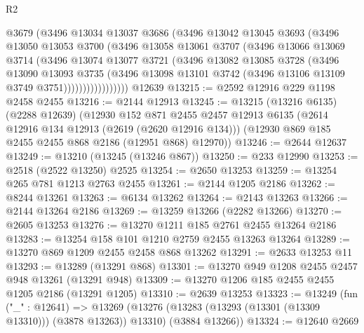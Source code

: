 \begin{lexlean}{R2}
\begin{coremodule}
                  @3679
                  (@3496
                    @13034
                    @13037
                    @3686
                    (@3496
                      @13042
                      @13045
                      @3693
                      (@3496
                        @13050
                        @13053
                        @3700
                        (@3496
                          @13058
                          @13061
                          @3707
                          (@3496
                            @13066
                            @13069
                            @3714
                            (@3496
                              @13074
                              @13077
                              @3721
                              (@3496
                                @13082
                                @13085
                                @3728
                                (@3496
                                  @13090
                                  @13093
                                  @3735
                                  (@3496
                                    @13098
                                    @13101
                                    @3742
                                    (@3496 @13106 @13109 @3749 @3751)))))))))))))))))
    @12639
@13215 := @2592 @12916 @229 @1198 @2458 @2455
@13216 := @2144 @12913
@13245 := @13215
    (@13216 @6135)
    (@2288 @12639)
    (@12930
      @152
      @871
      @2455
      @2457
      @12913
      @6135
      (@2614 @12916 @134 @12913 (@2619 (@2620 @12916 @134)))
      (@12930 @869 @185 @2455 @2455 @868 @2186 (@12951 @868) @12970))
@13246 := @2644 @12637
@13249 := @13210 (@13245 (@13246 @867))
@13250 := @233 @12990
@13253 := @2518 (@2522 @13250) @2525
@13254 := @2650 @13253
@13259 := @13254 @265 @781 @1213 @2763 @2455
@13261 := @2144 @1205 @2186
@13262 := @8244 @13261
@13263 := @6134 @13262
@13264 := @2143 @13263
@13266 := @2144 @13264 @2186
@13269 := @13259 @13266 (@2282 @13266)
@13270 := @2605 @13253
@13276 := @13270 @1211 @185 @2761 @2455 @13264 @2186
@13283 := @13254 @158 @101 @1210 @2759 @2455 @13263 @13264
@13289 := @13270 @869 @1209 @2455 @2458 @868 @13262
@13291 := @2633 @13253 @11
@13293 := @13289 (@13291 @868)
@13301 := @13270 @949 @1208 @2455 @2457 @948 @13261 (@13291 @948)
@13309 := @13270 @1206 @185 @2455 @2455 @1205 @2186 (@13291 @1205)
@13310 := @2639 @13253
@13323 := @13249
    (fun ("_" : @12641) =>
    @13269 (@13276 (@13283 (@13293 (@13301 (@13309 @13310))) (@3878 @13263)) @13310) (@3884 @13266))
@13324 := @12640 @2669

\end{coremodule}
\end{lexlean}
